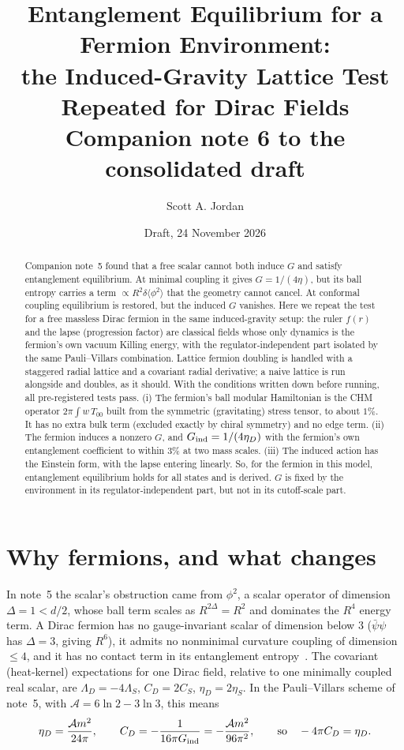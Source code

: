 \documentclass[11pt]{article}
\title{Entanglement Equilibrium for a Fermion Environment:\\ the Induced-Gravity Lattice Test Repeated for Dirac Fields\\[4pt]
\large Companion note 6 to the consolidated draft}
\author{Scott A. Jordan}
\date{Draft, 24 November 2026}
\begin{document}
\sloppy
\maketitle
\begin{abstract}
Companion note~5 found that a free scalar cannot both induce $G$ and satisfy entanglement equilibrium. At minimal coupling it gives $G=1/(4\eta)$, but its ball entropy carries a term $\propto R^2\delta\langle\phi^2\rangle$ that the geometry cannot cancel. At conformal coupling equilibrium is restored, but the induced $G$ vanishes. Here we repeat the test for a free massless Dirac fermion in the same induced-gravity setup: the ruler $f(r)$ and the lapse (progression factor) are classical fields whose only dynamics is the fermion's own vacuum Killing energy, with the regulator-independent part isolated by the same Pauli--Villars combination. Lattice fermion doubling is handled with a staggered radial lattice and a covariant radial derivative; a naive lattice is run alongside and doubles, as it should. With the conditions written down before running, all pre-registered tests pass.
(i) The fermion's ball modular Hamiltonian is the CHM operator $2\pi\int w\,T_{00}$ built from the symmetric (gravitating) stress tensor, to about $1\%$. It has no extra bulk term (excluded exactly by chiral symmetry) and no edge term.
(ii) The fermion induces a nonzero $G$, and $G_{\rm ind}=1/(4\eta_D)$ with the fermion's own entanglement coefficient to within $3\%$ at two mass scales.
(iii) The induced action has the Einstein form, with the lapse entering linearly.
So, for the fermion in this model, entanglement equilibrium holds for all states and is derived. $G$ is fixed by the environment in its regulator-independent part, but not in its cutoff-scale part.
\end{abstract}

\section{Why fermions, and what changes}
In note~5 the scalar's obstruction came from $\phi^2$, a scalar operator of dimension $\Delta=1<d/2$, whose ball term scales as $R^{2\Delta}=R^2$ and dominates the $R^4$ energy term. A Dirac fermion has no gauge-invariant scalar of dimension below $3$ ($\bar\psi\psi$ has $\Delta=3$, giving $R^6$), it admits no nonminimal curvature coupling of dimension $\le4$, and it has no contact term in its entanglement entropy~\cite{Kabat}. The covariant (heat-kernel) expectations for one Dirac field, relative to one minimally coupled real scalar, are $\Lambda_D=-4\Lambda_S$, $C_D=2C_S$, $\eta_D=2\eta_S$. In the Pauli--Villars scheme of note~5, with $\mathcal A=6\ln2-3\ln3$, this means
\begin{equation}
\eta_D=\frac{\mathcal A m^2}{24\pi},\qquad C_D=-\frac{1}{16\pi G_{\rm ind}}=-\frac{\mathcal A m^2}{96\pi^2},\qquad\text{so}\quad -4\pi C_D=\eta_D .
\end{equation}
\end{document}
